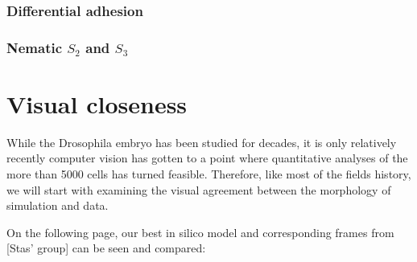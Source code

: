 \subsubsection{Differential adhesion}
\subsubsection{Nematic $S_2$ and $S_3$}


\section{Visual closeness}
While the Drosophila embryo has been studied for decades, it is only relatively recently computer vision has gotten to a point where quantitative analyses of the more than 5000 cells has turned feasible. Therefore, like most of the fields history, we will start with examining the visual agreement between the morphology of simulation and data.

On the following page, our best in silico model and corresponding frames from [Stas' group] can be seen and compared:

\newpage

